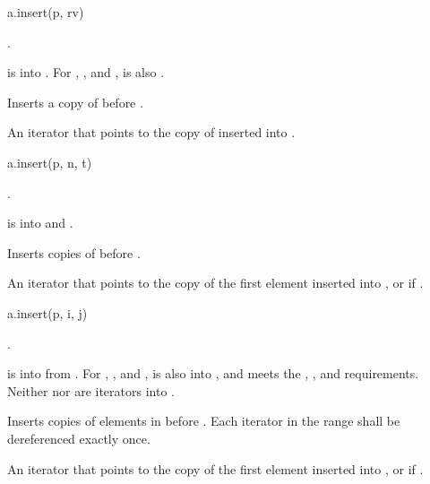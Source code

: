 \begin{itemdecl}
a.insert(p, rv)
\end{itemdecl}

\begin{itemdescr}
\pnum
\result
{}.

\pnum
\expects
{} is  into .
For , , and ,
 is also .

\pnum
\effects
Inserts a copy of  before .

\pnum
\returns
An iterator that points to the copy of  inserted into .
\end{itemdescr}

\begin{itemdecl}
a.insert(p, n, t)
\end{itemdecl}

\begin{itemdescr}
\pnum
\result
{}.

\pnum
\expects
{} is  into 
and .

\pnum
\effects
Inserts  copies of  before .

\pnum
\returns
An iterator
that points to the copy of the first element inserted into , or
 if .
\end{itemdescr}

\begin{itemdecl}
a.insert(p, i, j)
\end{itemdecl}

\begin{itemdescr}
\pnum
\result
{}.

\pnum
\expects
{} is  into  from .
For , , and ,
 is also
 into ,
and  meets the
,
, and
 requirements.
Neither  nor  are iterators into .

\pnum
\effects
Inserts copies of elements in \tcode{[i, j)} before .
Each iterator in the range  shall be dereferenced exactly once.

\pnum
\returns
An iterator
that points to the copy of the first element inserted into , or
 if .
\end{itemdescr}

